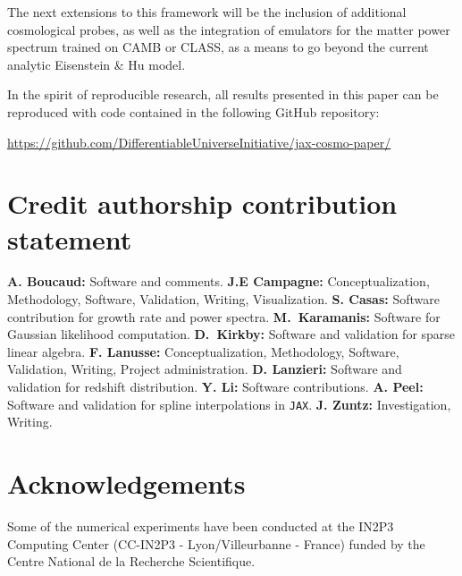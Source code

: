 \documentclass[twocolumn,twocolappendix,nofootinbib,iop]{openjournal}
\newcommand{\jax}{\texttt{JAX}}
\begin{document}
The next extensions to this framework will be the inclusion of additional cosmological probes, as well as the integration of emulators for the matter power spectrum trained on CAMB or CLASS, as a means to go beyond the current analytic Eisenstein \& Hu model.

In the spirit of reproducible research, all results presented in this paper can be reproduced with code contained in the following GitHub repository:

\url{https://github.com/DifferentiableUniverseInitiative/jax-cosmo-paper/}



\section*{Credit authorship contribution statement}
\textbf{A. Boucaud:} Software and comments.
\textbf{J.E Campagne:} Conceptualization, Methodology, Software, Validation, Writing, Visualization.
\textbf{S. Casas:} Software contribution for growth rate and power spectra.
\textbf{M.~Karamanis:} Software for Gaussian likelihood computation.
\textbf{D.~Kirkby:} Software and validation for sparse linear algebra.
\textbf{F. Lanusse:} Conceptualization, Methodology, Software, Validation, Writing, Project administration.
\textbf{D. Lanzieri:} Software and validation for redshift distribution.
\textbf{Y. Li:} Software contributions.
\textbf{A. Peel:} Software and validation for spline interpolations in \jax.
\textbf{J. Zuntz:} Investigation, Writing.


\section*{Acknowledgements}
Some of the numerical experiments have been conducted at the IN2P3 Computing Center (CC-IN2P3 - Lyon/Villeurbanne - France) funded by the Centre National de la Recherche Scientifique.
\end{document}
